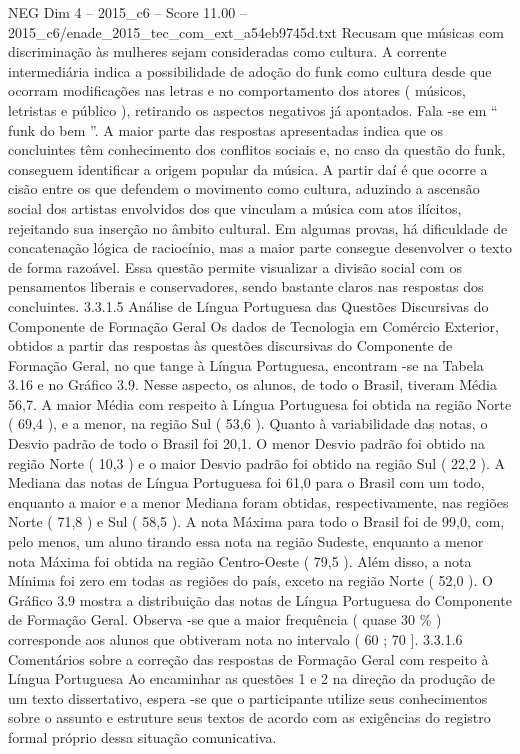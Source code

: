 \begin{textsample}{NEG Dim 4 – 2015\_c6 – Score 11.00 – 2015\_c6/enade\_2015\_tec\_com\_ext\_a54eb9745d.txt}
Recusam que músicas com discriminação às mulheres sejam consideradas como cultura.
A corrente intermediária indica a possibilidade de adoção do funk como cultura desde que ocorram modificações nas letras e no comportamento dos atores ( músicos, letristas e público ), retirando os aspectos negativos já apontados.
Fala -se em “ funk do bem ”.
A maior parte das respostas apresentadas indica que os concluintes têm conhecimento dos conflitos sociais e, no caso da questão do funk, conseguem identificar a origem popular da música.
A partir daí é que ocorre a cisão entre os que defendem o movimento como cultura, aduzindo a ascensão social dos artistas envolvidos dos que vinculam a música com atos ilícitos, rejeitando sua inserção no âmbito cultural.
Em algumas provas, há dificuldade de concatenação lógica de raciocínio, mas a maior parte consegue desenvolver o texto de forma razoável.
Essa questão permite visualizar a divisão social com os pensamentos liberais e conservadores, sendo bastante claros nas respostas dos concluintes. 3.3.1.5 Análise de Língua Portuguesa das Questões Discursivas do Componente de Formação Geral Os dados de Tecnologia em Comércio Exterior, obtidos a partir das respostas às questões discursivas do Componente de Formação Geral, no que tange à Língua Portuguesa, encontram -se na Tabela 3.16 e no Gráfico 3.9.
Nesse aspecto, os alunos, de todo o Brasil, tiveram Média 56,7.
A maior Média com respeito à Língua Portuguesa foi obtida na região Norte ( 69,4 ), e a menor, na região Sul ( 53,6 ).
Quanto à variabilidade das notas, o Desvio padrão de todo o Brasil foi 20,1.
O menor Desvio padrão foi obtido na região Norte ( 10,3 ) e o maior Desvio padrão foi obtido na região Sul ( 22,2 ).
A Mediana das notas de Língua Portuguesa foi 61,0 para o Brasil com um todo, enquanto a maior e a menor Mediana foram obtidas, respectivamente, nas regiões Norte ( 71,8 ) e Sul ( 58,5 ).
A nota Máxima para todo o Brasil foi de 99,0, com, pelo menos, um aluno tirando essa nota na região Sudeste, enquanto a menor nota Máxima foi obtida na região Centro-Oeste ( 79,5 ).
Além disso, a nota Mínima foi zero em todas as regiões do país, exceto na região Norte ( 52,0 ).
O Gráfico 3.9 mostra a distribuição das notas de Língua Portuguesa do Componente de Formação Geral.
Observa -se que a maior frequência ( quase 30 \% ) corresponde aos alunos que obtiveram nota no intervalo ( 60 ; 70 ]. 3.3.1.6 Comentários sobre a correção das respostas de Formação Geral com respeito à Língua Portuguesa Ao encaminhar as questões 1 e 2 na direção da produção de um texto dissertativo, espera -se que o participante utilize seus conhecimentos sobre o assunto e estruture seus textos de acordo com as exigências do registro formal próprio dessa situação comunicativa.

\end{textsample}
